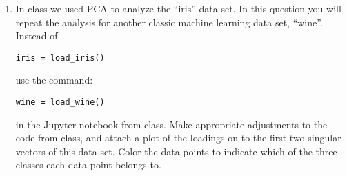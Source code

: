\documentclass[10pt]{article}
\begin{document}
\begin{enumerate}
\item In class we used PCA to analyze the ``iris'' data set. In this question you will repeat the analysis for another classic machine learning data set, ``wine''. Instead of \begin{verbatim}iris = load_iris()\end{verbatim} use the command:
\begin{verbatim}
wine = load_wine()
\end{verbatim}
 in the Jupyter notebook from class. Make appropriate adjustments to the code from class, and attach a plot of the loadings on to the first two singular vectors of this data set. Color the data points to indicate which of the three classes each data point belongs to.


\end{enumerate}
\end{document}
